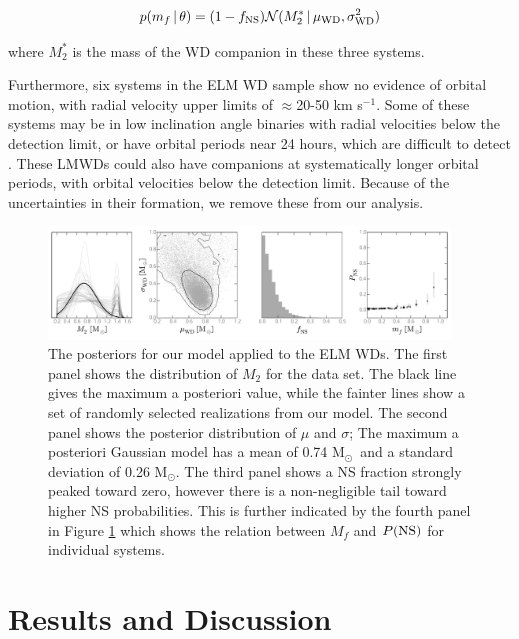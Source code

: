 \documentclass[apjl]{emulateapj}
\newcommand{\given}{\,|\,}
\newcommand{\Msun}{\ifmmode {{\rm M}_{\odot}}\else M$_{\odot}$\fi}
\begin{document}
\begin{equation}
p(m_f \given \theta) = (1-f_{\rm NS}) \mathcal{N}(M_2^* \given \mu_{\rm WD}, \sigma^2_{\rm WD})
\end{equation}

where $M_2^*$ is the mass of the WD companion in these three systems. 

Furthermore, six systems in the ELM WD sample show no evidence of orbital motion, with radial velocity upper limits of $\approx$20-50 km s$^{-1}$. Some of these systems may be in low inclination angle binaries with radial velocities below the detection limit, or have orbital periods near 24 hours, which are difficult to detect \citep{ELMV}. These LMWDs could also have companions at systematically longer orbital periods, with orbital velocities below the detection limit. Because of the uncertainties in their formation, we remove these from our analysis.




\begin{figure}[h!]
\begin{center}
\includegraphics[width=0.95\textwidth]{real-data.pdf}
\caption{The posteriors for our model applied to the ELM WDs. The first panel shows the distribution of $M_2$ for the data set. The black line gives the maximum a posteriori value, while the fainter lines show a set of randomly selected realizations from our model. The second panel shows the posterior distribution of $\mu$ and $\sigma$; The maximum a posteriori Gaussian model has a mean of 0.74 \Msun\ and a standard deviation of 0.26 \Msun. The third panel shows a NS fraction strongly peaked toward zero, however there is a non-negligible tail toward higher NS probabilities. This is further indicated by the fourth panel in Figure \ref{fig:ELM_post} which shows the relation between $M_f$ and $P({\rm NS})$ for individual systems. }
\label{fig:ELM_post}
\end{center}
\end{figure}



\section{Results and Discussion}
\end{document}
